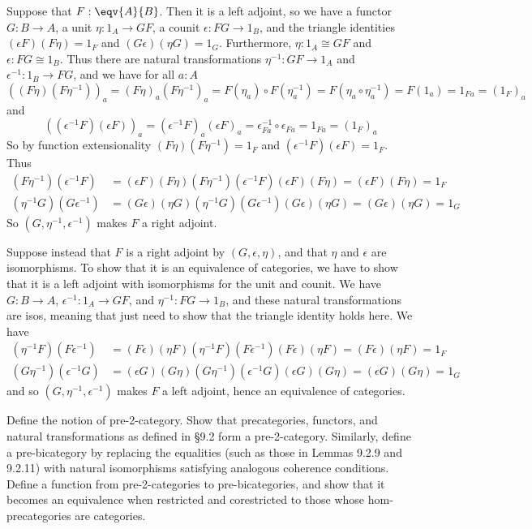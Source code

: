 \noindent
Suppose that $F : \eqv{A}{B}$.  Then it is a left adjoint, so we have a
functor $G : B \to A$, a unit $\eta : 1_{A} \to GF$, a counit $\epsilon : FG
\to 1_{B}$, and the triangle identities $(\epsilon F)(F \eta) = 1_{F}$ and $(G
\epsilon)(\eta G) = 1_{G}$.  Furthermore, $\eta : 1_{A} \cong GF$ and $\epsilon
: FG \cong 1_{B}$.  Thus there are natural transformations $\eta^{-1} : GF \to
1_{A}$ and $\epsilon^{-1} : 1_{B} \to FG$, and we have for all $a : A$
\[
  \left((F\eta)(F\eta^{-1})\right)_{a}
  =
  (F\eta)_{a}(F\eta^{-1})_{a}
  =
  F(\eta_{a}) \circ F(\eta^{-1}_{a})
  =
  F(\eta_{a} \circ \eta^{-1}_{a})
  =
  F(1_{a})
  =
  1_{Fa}
  =
  (1_{F})_{a}
\]
and
\[
  \left((\epsilon^{-1}F)(\epsilon F)\right)_{a}
  =
  (\epsilon^{-1}F)_{a}(\epsilon F)_{a}
  =
  \epsilon^{-1}_{Fa} \circ \epsilon_{Fa}
  =
  1_{Fa}
  =
  (1_{F})_{a}
\]
So by function extensionality $(F\eta)(F\eta^{-1}) = 1_{F}$ and
$(\epsilon^{-1}F)(\epsilon F) = 1_{F}$.  Thus
\begin{align*}
  (F\eta^{-1})(\epsilon^{-1}F)
  &=
  (\epsilon F)(F\eta)
  (F\eta^{-1})(\epsilon^{-1}F)
  (\epsilon F)(F \eta)
  =
  (\epsilon F)
  (F \eta)
  =
  1_{F}
  \\
  (\eta^{-1}G)(G\epsilon^{-1})
  &=
  (G\epsilon)(\eta G)
  (\eta^{-1}G)(G\epsilon^{-1})
  (G\epsilon)(\eta G)
  =
  (G\epsilon)
  (\eta G)
  =
  1_{G}
\end{align*}
So $(G, \eta^{-1}, \epsilon^{-1})$ makes $F$ a right adjoint.


Suppose instead that $F$ is a right adjoint by $(G, \epsilon, \eta)$, and that
$\eta$ and $\epsilon$ are isomorphisms.  To show that it is an equivalence of
categories, we have to show that it is a left adjoint with isomorphisms for the
unit and counit.  We have $G : B \to A$, $\epsilon^{-1} : 1_{A} \to GF$, and
$\eta^{-1} : FG \to 1_{B}$, and these natural transformations are isos, meaning
that just need to show that the triangle identity holds here.  We have
\begin{align*}
  (\eta^{-1}F)(F\epsilon^{-1})
  &=
  (F\epsilon)(\eta F)
  (\eta^{-1}F)(F\epsilon^{-1})
  (F\epsilon)(\eta F)
  =
  (F\epsilon)
  (\eta F)
  =
  1_{F}
  \\
  (G \eta^{-1})(\epsilon^{-1} G)
  &=
  (\epsilon G)(G \eta)
  (G \eta^{-1})(\epsilon^{-1} G)
  (\epsilon G)(G \eta)
  =
  (\epsilon G)(G \eta)
  =
  1_{G}
\end{align*}
and so $(G, \eta^{-1}, \epsilon^{-1})$ makes $F$ a left adjoint, hence an
equivalence of categories.


Define the notion of pre-2-category.  Show that precategories, functors, and
natural transformations as defined in \S9.2 form a pre-2-category.  Similarly,
define a pre-bicategory by replacing the equalities (such as those in Lemmas
9.2.9 and 9.2.11) with natural isomorphisms satisfying analogous coherence
conditions.  Define a function from pre-2-categories to pre-bicategories, and
show that it becomes an equivalence when restricted and corestricted to those
whose hom-precategories are categories.



